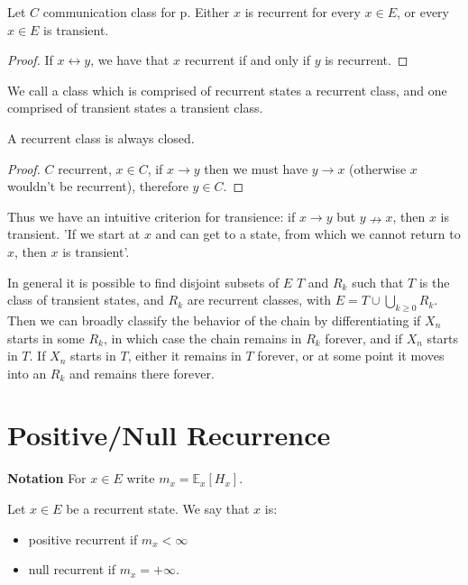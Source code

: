 \begin{cor}[]
	Let $C$ communication class for p. Either $x$ is recurrent for every $x \in E$, or every $x \in E$ is transient.
\end{cor}
\begin{proof}
	If $x  \leftrightarrow y $, we have that $x$ recurrent if and only if $y$ is recurrent.
\end{proof}
\begin{rmk}[]
	We call a class which is comprised of recurrent states a recurrent class, and one comprised of transient states a transient class.
\end{rmk}


\begin{cor}[]
	A recurrent class is always closed.
\end{cor}
\begin{proof}
	$C$ recurrent, $x \in C$, if $x \to y$ then we must have $y \to x$ (otherwise $x$ wouldn't be recurrent), therefore $y \in C$.
\end{proof}
\begin{cor}[]
	Thus we have an intuitive criterion for transience: if $x \to y$ but $y  \nrightarrow x$, then $x$ is transient. 'If we start at  $x$ and can get to a state, from which we cannot return to $x$, then $x$ is transient'.
\end{cor}

\begin{rmk}[]
	In general it is possible to find disjoint subsets of $E$ $T$ and $R_k$ such that $T$ is the class of transient states, and $R_k$ are recurrent classes, with $E = T \cup \bigcup_{k\geq 0}R_k$. Then we can broadly classify the behavior of the chain by differentiating if $X_n$ starts in some $R_k$, in which case the chain remains in $R_k$ forever, and if $X_n$ starts in $T$. If $X_n$ starts in $T$, either it remains in $T$ forever, or at some point it moves into an $R_k$ and remains there forever.
\end{rmk}


\section{Positive/Null Recurrence}
\textbf{Notation} For $x \in E$ write $m_{x}=\mathbb{E}_{x} \left[ H_x \right] $.

\begin{defn}
	Let $x \in E$ be a recurrent state. We say that $x$ is:
\begin{itemize}
	\item positive recurrent if $\boxed{m_x<\infty}$ 
	\item null recurrent if $\boxed{m_x=+\infty}$.
\end{itemize}

\end{defn}

